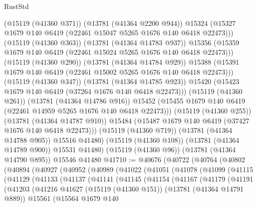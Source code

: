 \begin{lexlean}{RustStd}
\begin{coremodule}
                    (@15119 (@41360 @371))
                    (@13781 (@41364 @2200 @944))
                    @15324
                    (@15327 @1679 @140 @6419 (@22461 @15047 @5265 @1676 @140 @6418 @22473)))
                  (@15119 (@41360 @363))
                  (@13781 (@41364 @14783 @937))
                  @15356
                  (@15359 @1679 @140 @6419 (@22461 @15024 @5265 @1676 @140 @6418 @22473)))
                (@15119 (@41360 @290))
                (@13781 (@41364 @14784 @929))
                @15388
                (@15391 @1679 @140 @6419 (@22461 @15002 @5265 @1676 @140 @6418 @22473)))
              (@15119 (@41360 @347))
              (@13781 (@41364 @14785 @923))
              @15420
              (@15423 @1679 @140 @6419 (@37264 @1676 @140 @6418 @22473)))
            (@15119 (@41360 @261))
            (@13781 (@41364 @14786 @916))
            @15452
            (@15455 @1679 @140 @6419 (@22461 @14959 @5265 @1676 @140 @6418 @22473)))
          (@15119 (@41360 @255))
          (@13781 (@41364 @14787 @910))
          @15484
          (@15487 @1679 @140 @6419 (@37427 @1676 @140 @6418 @22473)))
        (@15119 (@41360 @719))
        (@13781 (@41364 @14788 @905))
        @15516
        @41480)
      (@15119 (@41360 @108))
      (@13781 (@41364 @14789 @900))
      @15531
      @41480)
    (@15119 (@41360 @96))
    (@13781 (@41364 @14790 @895))
    @15546
    @41480
@41710 := @40676
    (@40722
      (@40764
        (@40802
          (@40894
            (@40927
              (@40952
                (@40989
                  (@41022
                    (@41051
                      (@41078
                        (@41099
                          (@41115
                            (@41129
                              (@41133
                                (@41137
                                  (@41141
                                    (@41145
                                      (@41154
                                        (@41167
                                          (@41179
                                            (@41191
                                              (@41203
                                                (@41216
                                                  @41627
                                                  (@15119 (@41360 @151))
                                                  (@13781 (@41364 @14791 @889))
                                                  @15561
                                                  (@15564
                                                    @1679
                                                    @140

\end{coremodule}
\end{lexlean}
